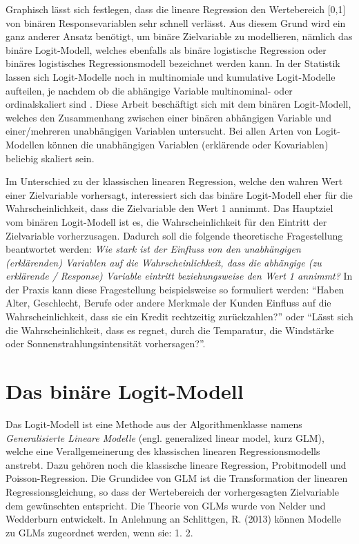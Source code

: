 \documentclass[12pt,]{article}
\begin{document}
Graphisch lässt sich festlegen, dass die lineare Regression den
Wertebereich {[}0,1{]} von binären Responsevariablen sehr schnell
verlässt. Aus diesem Grund wird ein ganz anderer Ansatz benötigt, um
binäre Zielvariable zu modellieren, nämlich das binäre Logit-Modell,
welches ebenfalls als binäre logistische Regression oder binäres
logistisches Regressionsmodell bezeichnet werden kann. In der Statistik
lassen sich Logit-Modelle noch in multinomiale und kumulative
Logit-Modelle aufteilen, je nachdem ob die abhängige Variable
multinominal- oder ordinalskaliert sind . Diese Arbeit beschäftigt sich
mit dem binären Logit-Modell, welches den Zusammenhang zwischen einer
binären abhängigen Variable und einer/mehreren unabhängigen Variablen
untersucht. Bei allen Arten von Logit-Modellen können die unabhängigen
Variablen (erklärende oder Kovariablen) beliebig skaliert sein.

Im Unterschied zu der klassischen linearen Regression, welche den wahren
Wert einer Zielvariable vorhersagt, interessiert sich das binäre
Logit-Modell eher für die Wahrscheinlichkeit, dass die Zielvariable den
Wert 1 annimmt. Das Hauptziel vom binären Logit-Modell ist es, die
Wahrscheinlichkeit für den Eintritt der Zielvariable vorherzusagen.
Dadurch soll die folgende theoretische Fragestellung beantwortet werden:
\emph{Wie stark ist der Einfluss von den unabhängigen (erklärenden)
Variablen auf die Wahrscheinlichkeit, dass die abhängige (zu erklärende
/ Response) Variable eintritt beziehungsweise den Wert 1 annimmt?} In
der Praxis kann diese Fragestellung beispielsweise so formuliert werden:
``Haben Alter, Geschlecht, Berufe oder andere Merkmale der Kunden
Einfluss auf die Wahrscheinlichkeit, dass sie ein Kredit rechtzeitig
zurückzahlen?'' oder ``Lässt sich die Wahrscheinlichkeit, dass es
regnet, durch die Temparatur, die Windstärke oder
Sonnenstrahlungsintensität vorhersagen?''.

\section{Das binäre Logit-Modell}\label{das-binare-logit-modell}

Das Logit-Modell ist eine Methode aus der Algorithmenklasse namens
\emph{Generalisierte Lineare Modelle} (engl. generalized linear model,
kurz GLM), welche eine Verallgemeinerung des klassischen linearen
Regressionsmodells anstrebt. Dazu gehören noch die klassische lineare
Regression, Probitmodell und Poisson-Regression. Die Grundidee von GLM
ist die Transformation der linearen Regressionsgleichung, so dass der
Wertebereich der vorhergesagten Zielvariable dem gewünschten entspricht.
Die Theorie von GLMs wurde von Nelder und Wedderburn entwickelt. In
Anlehnung an Schlittgen, R. (2013) können Modelle zu GLMs zugeordnet
werden, wenn sie: 1. 2.
\end{document}
